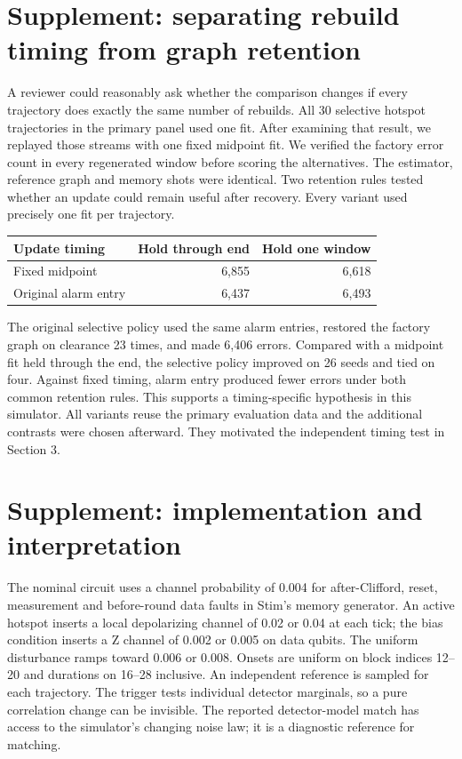 \documentclass[10pt]{article}
\begin{document}
\section*{Supplement: separating rebuild timing from graph retention}
A reviewer could reasonably ask whether the comparison changes if every trajectory does exactly the same number of rebuilds. All 30 selective hotspot trajectories in the primary panel used one fit. After examining that result, we replayed those streams with one fixed midpoint fit. We verified the factory error count in every regenerated window before scoring the alternatives. The estimator, reference graph and memory shots were identical. Two retention rules tested whether an update could remain useful after recovery. Every variant used precisely one fit per trajectory.
\begin{center}
\begin{tabular}{lrr}
\hline
Update timing & Hold through end & Hold one window \\
\hline
Fixed midpoint & 6,855 & 6,618 \\
Original alarm entry & 6,437 & 6,493 \\
\hline
\end{tabular}
\end{center}
The original selective policy used the same alarm entries, restored the factory graph on clearance 23 times, and made 6,406 errors. Compared with a midpoint fit held through the end, the selective policy improved on 26 seeds and tied on four. Against fixed timing, alarm entry produced fewer errors under both common retention rules. This supports a timing-specific hypothesis in this simulator. All variants reuse the primary evaluation data and the additional contrasts were chosen afterward. They motivated the independent timing test in Section 3.

\section*{Supplement: implementation and interpretation}
The nominal circuit uses a channel probability of 0.004 for after-Clifford, reset, measurement and before-round data faults in Stim's memory generator. An active hotspot inserts a local depolarizing channel of 0.02 or 0.04 at each tick; the bias condition inserts a Z channel of 0.002 or 0.005 on data qubits. The uniform disturbance ramps toward 0.006 or 0.008. Onsets are uniform on block indices 12--20 and durations on 16--28 inclusive. An independent reference is sampled for each trajectory. The trigger tests individual detector marginals, so a pure correlation change can be invisible. The reported detector-model match has access to the simulator's changing noise law; it is a diagnostic reference for matching.
\end{document}
